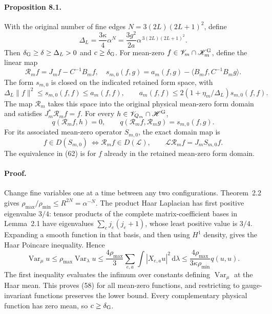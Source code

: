 \documentclass[11pt]{article}
\newcommand{\Var}{\operatorname{Var}}
\newcommand{\dd}{\,\mathrm d}
\newcommand{\HH}{\mathscr H}
\newcommand{\KK}{\mathscr K}
\newcommand{\LL}{\mathscr L}
\newcommand{\VV}{\mathscr V}
\begin{document}
\paragraph{Proposition 8.1.}
With the original number of fine edges $N=3(2L)(2L+1)^2$, define
\begin{equation}\label{eq:finitegap}
 \Delta_L=\frac{3\kappa}{4}\alpha^N
          =\frac{3g^2}{2a}\alpha^{\,3(2L)(2L+1)^2}.
\end{equation}
Then $\delta_{\rm G}\geq\delta\geq\Delta_L>0$ and $c\geq\delta_{\rm G}$.
For mean-zero $f\in\VV_m\cap\KK_m^{\rm G}$, define the linear map
\begin{equation}\label{eq:Rzero}
 \mathcal R_m f=J_mf-C^{-1}B_mf,\quad
 s_{m,0}(f,g)=a_m(f,g)-\langle B_mf,C^{-1}B_mg\rangle.
\end{equation}
The form $s_{m,0}$ is closed on the indicated retained form space,
with
\begin{equation}\label{eq:zerocoercivity}
 \Delta_L\|f\|^2\leq s_{m,0}(f,f)\leq a_m(f,f),\qquad
 a_m(f,f)\leq2(1+\eta_m/\Delta_L)s_{m,0}(f,f).
\end{equation}
The map $\mathcal R_m$ takes this space into the original physical
mean-zero form domain and satisfies $J_m^*\mathcal R_mf=f$.
For every $h\in\VV_{Q_m}\cap\HH^{\rm G}$,
\begin{equation}\label{eq:zeroorthogonal}
 q(\mathcal R_m f,h)=0,\qquad
 q(\mathcal R_m f,\mathcal R_m g)=s_{m,0}(f,g).
\end{equation}
For its associated mean-zero operator $S_{m,0}$, the exact domain map is
\begin{equation}\label{eq:zerodomain}
 f\in D(S_{m,0})\ \Longleftrightarrow
 \mathcal R_m f\in D(\LL),\qquad
 \LL\mathcal R_m f=J_mS_{m,0}f.
\end{equation}
The equivalence in (62) is for $f$ already in the
retained mean-zero form domain.

\paragraph{Proof.}
Change fine variables one at a time between any two configurations.
Theorem~2.2 gives
$\rho_{\max}/\rho_{\min}\leq R^{2N}=\alpha^{-N}$.
The product Haar Laplacian has first positive eigenvalue $3/4$:
tensor products of the complete matrix-coefficient bases in
Lemma~2.1 have eigenvalues
$\sum_e j_e(j_e+1)$, whose least positive value is $3/4$.
Expanding a smooth function in that basis, and then using $H^1$
density, gives the Haar Poincare inequality. Hence
\[
 \Var_\mu u
 \leq\rho_{\max}\Var_\lambda u
 \leq\frac{4\rho_{\max}}3\sum_{e,a}\int|X_{e,a}u|^2\dd\lambda
 \leq\frac{4\rho_{\max}}{3\kappa\rho_{\min}}q(u,u).
\]
The first inequality evaluates the infimum over constants defining
$\Var_\mu$ at the Haar mean. This proves (58) for all
mean-zero functions, and restricting to gauge-invariant functions
preserves the lower bound. Every complementary physical function has
zero mean, so $c\geq\delta_{\rm G}$.
\end{document}

